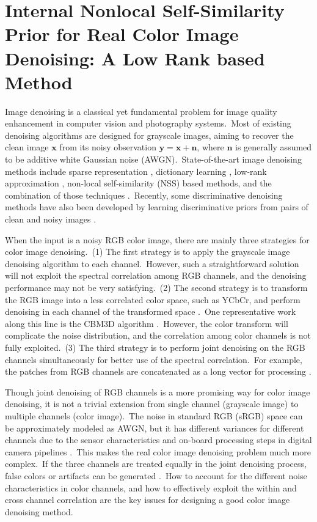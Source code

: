 %
\chapter{Internal Nonlocal Self-Similarity Prior for Real Color Image Denoising: A Low Rank based Method}
\label{sec:internallr}

Image denoising is a classical yet fundamental problem for image quality enhancement in computer vision and photography systems.\ Most of existing denoising algorithms are designed for grayscale images, aiming to recover the clean image $\mathbf{x}$ from its noisy observation $\mathbf{y}=\mathbf{x}+\mathbf{n}$, where $\mathbf{n}$ is generally assumed to be additive white Gaussian noise (AWGN).\ State-of-the-art image denoising methods include sparse representation \cite{bm3d}, dictionary learning \cite{ksvd}, low-rank approximation \cite{wnnm}, non-local self-similarity (NSS) \cite{nlm} based methods, and the combination of those techniques \cite{ksvd,bm3d,lssc,epll,ncsr,pgpd,wnnm}.\ Recently, some discriminative denoising methods have also been developed by learning discriminative priors from pairs of clean and noisy images \cite{mlp,csf,chen2015learning,dncnn}. 

When the input is a noisy RGB color image, there are mainly three strategies for color image denoising.\ (1) The first strategy is to apply the grayscale image denoising algorithm to each channel.\ However, such a straightforward solution will not exploit the spectral correlation among RGB channels, and the denoising performance may not be very satisfying.\ (2) The second strategy is to transform the RGB image into a less correlated color space, such as YCbCr, and perform denoising in each channel of the transformed space \cite{foe,cbm3d}.\ One representative work along this line is the CBM3D algorithm \cite{cbm3d}.\ However, the color transform will complicate the noise distribution, and the correlation among color channels is not fully exploited.\ (3) The third strategy is to perform joint denoising on the RGB channels simultaneously for better use of the spectral correlation.\ For example, the patches from RGB channels are concatenated as a long vector for processing \cite{mairal2008sparse,Zhu_2016_CVPR}. 

Though joint denoising of RGB channels is a more promising way for color image denoising, it is not a trivial extension from single channel (grayscale image) to multiple channels (color image).\ The noise in standard RGB (sRGB) space can be approximately modeled as AWGN, but it has different variances for different channels \cite{Liu2008,Leungtip,crosschannel2016} due to the sensor characteristics and on-board processing steps in digital camera pipelines \cite{crosschannel2016,karaimer_brown_ECCV_2016}.\ This makes the real color image denoising problem much more complex.\ If the three channels are treated equally in the joint denoising process, false colors or artifacts can be generated \cite{mairal2008sparse}.\ How to account for the different noise characteristics in color channels, and how to effectively exploit the within and cross channel correlation are the key issues for designing a good color image denoising method.

